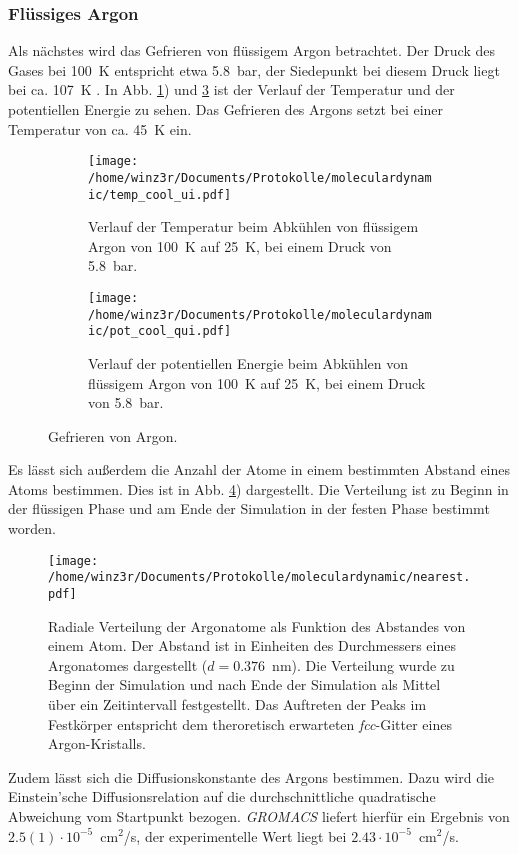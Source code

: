 \subsubsection{Flüssiges Argon}
%
Als nächstes wird das Gefrieren von flüssigem Argon betrachtet. Der Druck des Gases bei 100~K entspricht etwa 5.8~bar, der Siedepunkt bei diesem Druck liegt bei ca. 107~K \cite{phasediagram}.
In Abb. \ref{fig:liqtemp}) und \ref{fig:liqpot} ist der Verlauf der Temperatur und der potentiellen Energie zu sehen.
Das Gefrieren des Argons setzt bei einer Temperatur von ca. 45~K ein. 
\begin{figure}
\begin{subfigure}{0.45\textwidth}\centering
\texttt{[image: /home/winz3r/Documents/Protokolle/moleculardynamic/temp\_cool\_ui.pdf]}\caption{\centering Verlauf der Temperatur beim Abkühlen von flüssigem Argon von 100~K auf 25~K, bei einem Druck von 5.8~bar.}\label{fig:liqtemp}
\end{subfigure}
\hspace{0.5cm}
\begin{subfigure}{0.45\textwidth}\centering
\texttt{[image: /home/winz3r/Documents/Protokolle/moleculardynamic/pot\_cool\_qui.pdf]}\caption{\centering Verlauf der potentiellen Energie beim Abkühlen von flüssigem Argon von 100~K auf 25~K, bei einem Druck von 5.8~bar.}\label{fig:liqpot}
\end{subfigure}
\caption{Gefrieren von Argon.}
\end{figure}
\noindent
Es lässt sich außerdem die Anzahl der Atome in einem bestimmten Abstand eines Atoms bestimmen. Dies ist in Abb. \ref{fig:nearest}) dargestellt. Die Verteilung ist zu Beginn in der flüssigen Phase und am Ende der Simulation in der festen Phase bestimmt worden.
\begin{figure}
\centering
\texttt{[image: /home/winz3r/Documents/Protokolle/moleculardynamic/nearest.pdf]}\caption{ \centering Radiale Verteilung der Argonatome als Funktion des Abstandes von einem Atom. Der Abstand ist in Einheiten des Durchmessers eines Argonatomes dargestellt ($d=0.376$~nm). Die Verteilung wurde zu Beginn der Simulation und nach Ende der Simulation als Mittel über ein Zeitintervall festgestellt.
Das Auftreten der Peaks im Festkörper entspricht dem theroretisch erwarteten \emph{fcc}-Gitter eines Argon-Kristalls.}\label{fig:nearest}
\end{figure}
\noindent
Zudem lässt sich die Diffusionskonstante des Argons bestimmen. Dazu wird die Einstein'sche Diffusionsrelation auf die durchschnittliche quadratische Abweichung vom Startpunkt bezogen. \emph{GROMACS} liefert hierfür ein Ergebnis von $2.5(1)\cdot 10 ^{-5}$~cm$^2$/s, der experimentelle Wert liegt bei $2.43 \cdot
10^{-5}$~cm$^2$/s.
